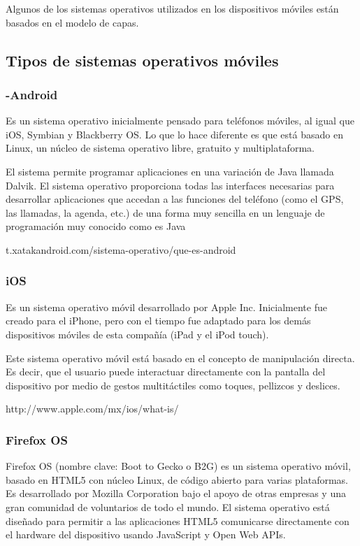 Algunos de los sistemas operativos utilizados en los dispositivos móviles están basados en el modelo de capas.

\subsection{Tipos de sistemas operativos móviles}

\subsubsection{-Android} 

Es un sistema operativo inicialmente pensado para teléfonos móviles, al igual que iOS, Symbian y Blackberry OS. Lo que lo hace diferente es que está basado en Linux, un núcleo de sistema operativo libre, gratuito y multiplataforma.

El sistema permite programar aplicaciones en una variación de Java llamada Dalvik. El sistema operativo proporciona todas las interfaces necesarias para desarrollar aplicaciones que accedan a las funciones del teléfono (como el GPS, las llamadas, la agenda, etc.) de una forma muy sencilla en un lenguaje de programación muy conocido como es Java

t.xatakandroid.com/sistema-operativo/que-es-android

\subsubsection{iOS} 

Es un sistema operativo móvil desarrollado por Apple Inc. Inicialmente fue creado para el iPhone, pero con el tiempo fue adaptado para los demás dispositivos móviles de esta compañía (iPad y el iPod touch).

Este sistema operativo móvil está basado en el concepto de manipulación directa. Es decir, que el usuario puede interactuar directamente con la pantalla del dispositivo por medio de gestos multitáctiles como toques, pellizcos y deslices.

http://www.apple.com/mx/ios/what-is/


\subsubsection{Firefox OS}

Firefox OS (nombre clave: Boot to Gecko o B2G) es un sistema operativo móvil, basado en HTML5 con núcleo Linux, de código abierto para varias plataformas. Es desarrollado por Mozilla Corporation bajo el apoyo de otras empresas y una gran comunidad de voluntarios de todo el mundo. El sistema operativo está diseñado para permitir a las aplicaciones HTML5 comunicarse directamente con el hardware del dispositivo usando JavaScript y Open Web APIs.


